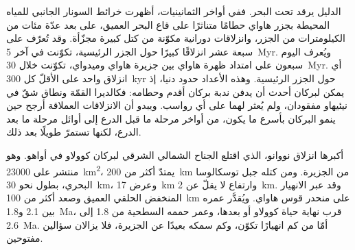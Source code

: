 الدليل يرقد تحت البحر. ففي أواخر الثمانينيات، أظهرت خرائط السونار الجانبي للمياه المحيطة
بجزر هاواي حطامًا متناثرًا على قاع البحر العميق، على بعد عدّة مئات من الكيلومترات من
الجزر، وانزلاقات دورانية مكوّنة من كتل كبيرة مجزّأة. وقد تُعرّف على سبعة عشر انزلاقًا كبيرًا
حول الجزر الرئيسية، تكوّنت في آخر \qty{5}{Myr}. ويُعرف اليوم سبعون على امتداد
ظهرة هاواي بين جزيرة هاواي وميدواي، تكوّنت خلال \qty{30}{Myr}. أي انزلاق واحد على الأقلّ
كل \qty{300}{kyr} حول الجزر الرئيسية. وهذه الأعداد حدود دنيا، إذ يمكن لبركان
أحدث أن يدفن ندبة بركان أقدم وحطامه: فكالديرا القمّة ونطاق شقّ في
نيئيهاو مفقودان، ولم يُعثر لهما على أي رواسب. ويبدو أن الانزلاقات العملاقة أرجح حين
ينمو البركان بأسرع ما يكون، من أواخر مرحلة ما قبل الدرع إلى أوائل مرحلة ما بعد الدرع، لكنها تستمرّ
طويلًا بعد ذلك.

أكبرها انزلاق نووانو، الذي اقتلع الجناح الشمالي الشرقي لبركان كوولاو
في أواهو. وهو  منتشر على \qty{23000}{km^2}، يمتدّ أكثر من
\qty{200}{km} من الجزيرة. ومن كتله جبل توسكالوسا البحري، بطول نحو \qty{30}{km}،
وعرض \qty{17}{km} وارتفاع لا يقلّ عن \qty{2}{km}. وقد عبر الانهيار المنخفض الحلقي العميق وصعد
أكثر من \qty{100}{km} على منحدر قوس هاواي. ويُقدَّر عمره بين 2.1 و\qty{1.8}{Ma}،
قرب نهاية حياة كوولاو أو بعدها، وعمر حممه السطحية من 1.8 إلى
\qty{2.6}{Ma}. أمّا من كم انهيارًا تكوّن، وكم سمكه بعيدًا عن الجزيرة، فلا يزالان
سؤالين مفتوحين.

